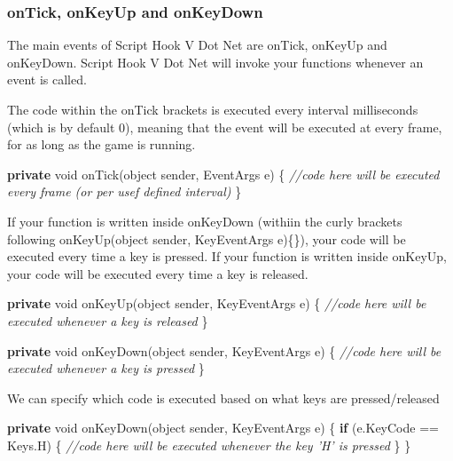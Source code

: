 \documentclass[
  openany]{book}
\newenvironment{Shaded}{\begin{snugshade}}{\end{snugshade}}
\newcommand{\CommentTok}[1]{\textcolor[rgb]{0.56,0.35,0.01}{\textit{#1}}}
\newcommand{\DataTypeTok}[1]{\textcolor[rgb]{0.13,0.29,0.53}{#1}}
\newcommand{\FunctionTok}[1]{\textcolor[rgb]{0.00,0.00,0.00}{#1}}
\newcommand{\KeywordTok}[1]{\textcolor[rgb]{0.13,0.29,0.53}{\textbf{#1}}}
\newcommand{\NormalTok}[1]{#1}
\begin{document}
\hypertarget{ontick-onkeyup-and-onkeydown}{%
\subsubsection{onTick, onKeyUp and onKeyDown}\label{ontick-onkeyup-and-onkeydown}}

The main events of Script Hook V Dot Net are onTick, onKeyUp and onKeyDown. Script Hook V Dot Net will invoke your functions whenever an event is called.

The code within the onTick brackets is executed every interval milliseconds (which is by default 0), meaning that the event will be executed at every frame, for as long as the game is running.

\begin{Shaded}
\begin{Highlighting}[]
 \KeywordTok{private} \DataTypeTok{void} \FunctionTok{onTick}\NormalTok{(}\DataTypeTok{object}\NormalTok{ sender, EventArgs e)}
\NormalTok{ \{}
        \CommentTok{//code here will be executed every frame (or per usef defined interval)}
\NormalTok{ \}}
\end{Highlighting}
\end{Shaded}

If your function is written inside onKeyDown (withiin the curly brackets following onKeyUp(object sender, KeyEventArgs e)\{\}), your code will be executed every time a key is pressed. If your function is written inside onKeyUp, your code will be executed every time a key is released.

\begin{Shaded}
\begin{Highlighting}[]
\KeywordTok{private} \DataTypeTok{void} \FunctionTok{onKeyUp}\NormalTok{(}\DataTypeTok{object}\NormalTok{ sender, KeyEventArgs e)}
\NormalTok{\{}
      \CommentTok{//code here will be executed whenever a key is released}
\NormalTok{\}}

\KeywordTok{private} \DataTypeTok{void} \FunctionTok{onKeyDown}\NormalTok{(}\DataTypeTok{object}\NormalTok{ sender, KeyEventArgs e)}
\NormalTok{\{}
      \CommentTok{//code here will be executed whenever a key is pressed}
\NormalTok{\} }
\end{Highlighting}
\end{Shaded}

We can specify which code is executed based on what keys are pressed/released

\begin{Shaded}
\begin{Highlighting}[]
\KeywordTok{private} \DataTypeTok{void} \FunctionTok{onKeyDown}\NormalTok{(}\DataTypeTok{object}\NormalTok{ sender, KeyEventArgs e)}
\NormalTok{\{}
    \KeywordTok{if}\NormalTok{ (e.}\FunctionTok{KeyCode}\NormalTok{ == Keys.}\FunctionTok{H}\NormalTok{)}
\NormalTok{    \{}
        \CommentTok{//code here will be executed whenever the key 'H' is pressed }
\NormalTok{    \}}
\NormalTok{\} }
\end{Highlighting}
\end{Shaded}
\end{document}

